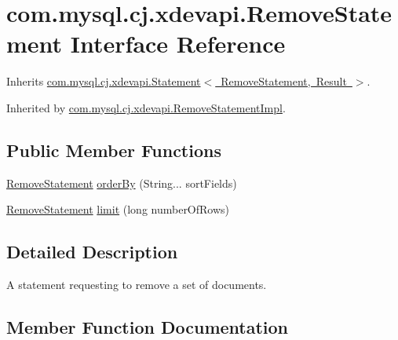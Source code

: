 \hypertarget{interfacecom_1_1mysql_1_1cj_1_1xdevapi_1_1_remove_statement}{}\section{com.\+mysql.\+cj.\+xdevapi.\+Remove\+Statement Interface Reference}
\label{interfacecom_1_1mysql_1_1cj_1_1xdevapi_1_1_remove_statement}


Inherits \mbox{\hyperlink{interfacecom_1_1mysql_1_1cj_1_1xdevapi_1_1_statement}{com.\+mysql.\+cj.\+xdevapi.\+Statement$<$ Remove\+Statement, Result $>$}}.



Inherited by \mbox{\hyperlink{classcom_1_1mysql_1_1cj_1_1xdevapi_1_1_remove_statement_impl}{com.\+mysql.\+cj.\+xdevapi.\+Remove\+Statement\+Impl}}.

\subsection*{Public Member Functions}
\begin{DoxyCompactItemize}
\item 
\mbox{\hyperlink{interfacecom_1_1mysql_1_1cj_1_1xdevapi_1_1_remove_statement}{Remove\+Statement}} \mbox{\hyperlink{interfacecom_1_1mysql_1_1cj_1_1xdevapi_1_1_remove_statement_a98adae04f69c2128a44d1c766f00a5f2}{order\+By}} (String... sort\+Fields)
\item 
\mbox{\hyperlink{interfacecom_1_1mysql_1_1cj_1_1xdevapi_1_1_remove_statement}{Remove\+Statement}} \mbox{\hyperlink{interfacecom_1_1mysql_1_1cj_1_1xdevapi_1_1_remove_statement_aa3a505d5a1eb7d0dd13649e16a40671e}{limit}} (long number\+Of\+Rows)
\end{DoxyCompactItemize}


\subsection{Detailed Description}
A statement requesting to remove a set of documents. 

\subsection{Member Function Documentation}
\mbox{\label{interfacecom_1_1mysql_1_1cj_1_1xdevapi_1_1_remove_statement_aa3a505d5a1eb7d0dd13649e16a40671e}} 
